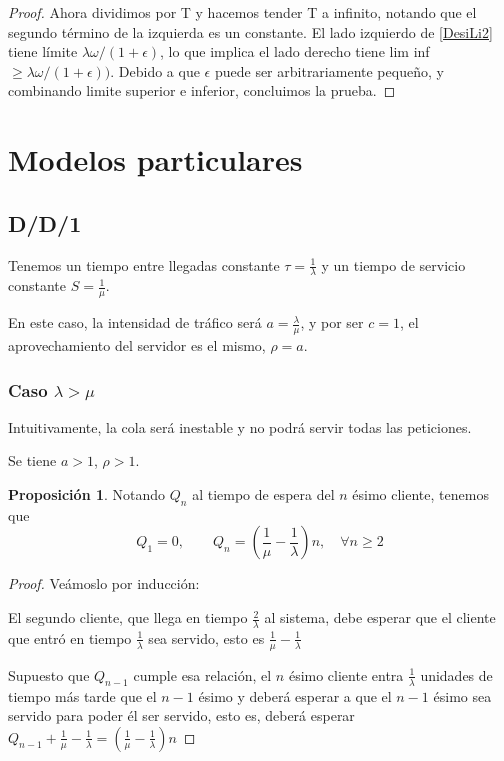 \documentclass[a4paper,10pt]{scrartcl}
\theoremstyle{definition}
\newtheorem*{fact}{Proposición}
\numberwithin{equation}{section}
\begin{document}
\begin{proof}
Ahora dividimos por T y hacemos tender T a infinito, notando que el segundo término de la izquierda es un
constante. El lado izquierdo de \ref{DesiLi2} tiene límite $ \lambda\omega / (1 + \epsilon)$, lo que implica el lado derecho tiene lim inf $\geq \lambda\omega / (1 + \epsilon))$. Debido a que $\epsilon$ puede ser arbitrariamente pequeño, y combinando limite superior e inferior, concluimos la prueba.
\end{proof}

\section{Modelos particulares}
\subsection{D/D/1}
Tenemos un tiempo entre llegadas constante $\tau = \frac{1}{\lambda}$ y un tiempo de servicio constante $S = \frac{1}{\mu}$.

En este caso, la intensidad de tráfico será $a=\frac{\lambda}{\mu}$, y por ser $c = 1$, el aprovechamiento del servidor es el mismo, $\rho = a$.

\subsubsection{Caso $\lambda > \mu$}
Intuitivamente, la cola será inestable y no podrá servir todas las peticiones. 

Se tiene $a > 1$, $\rho > 1$.

\begin{fact}
Notando $Q_n$ al tiempo de espera del $n$ ésimo cliente, tenemos que \[Q_1 = 0, \qquad Q_n = \left(\frac{1}{\mu} - \frac{1}{\lambda}\right)n, \quad \forall n\ge 2\]
\end{fact}

\begin{proof}
Veámoslo por inducción:

El segundo cliente, que llega en tiempo $\frac{2}{\lambda}$ al sistema, debe esperar que el cliente que entró en tiempo $\frac{1}{\lambda}$ sea servido,
esto es $\frac{1}{\mu} - \frac{1}{\lambda}$

Supuesto que $Q_{n-1}$ cumple esa relación, el $n$ ésimo cliente entra $\frac{1}{\lambda}$ unidades de tiempo
más tarde que el $n-1$ ésimo y deberá esperar a que el $n-1$ ésimo sea servido para poder él ser servido, esto es,
deberá esperar $Q_{n-1} + \frac{1}{\mu} - \frac{1}{\lambda} = \left(\frac{1}{\mu} - \frac{1}{\lambda}\right)n$
\end{proof}
\end{document}
